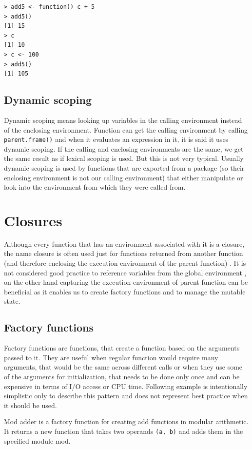 \documentclass[thesis=B,english]{FITthesis}[2012/10/20]
\begin{document}
\begin{verbatim}
> add5 <- function() c + 5
> add5()
[1] 15
> c
[1] 10
> c <- 100
> add5()
[1] 105
\end{verbatim}

\subsection{Dynamic scoping}
Dynamic scoping means looking up variables in the calling environment instead of the enclosing environment. Function can get the calling environment by calling \verb|parent.frame()| and when it evaluates an expression in it, it is said it uses dynamic scoping. If the calling and enclosing environments are the same, we get the same result as if lexical scoping is used. But this is not very typical. Usually dynamic scoping is used by functions that are exported from a package (so their enclosing environment is not our calling environment) that either manipulate or look into the environment from which they were called from.

\section{Closures}
Although every function that has an environment associated with it is a closure, the name closure is often used just for functions returned from another function (and therefore enclosing the execution environment of the parent function) \cite{advR}. It is not considered good practice to reference variables from the global environment \cite{advR}, on the other hand capturing the execution environment of parent function can be beneficial as it enables us to create factory functions and to manage the mutable state.

\subsection{Factory functions} \label{ssec:clos1}
Factory functions are functions, that create a function based on the arguments passed to it. They are useful when regular function would require many arguments, that would be the same across different calls or when they use some of the arguments for initialization, that needs to be done only once and can be expensive in terms of I/O access or CPU time. Following example is intentionally simplistic only to describe this pattern and does not represent best practice when it should be used.

Mod adder is a factory function for creating add functions in modular arithmetic. It returns a new function that takes two operands \verb|(a, b)| and adds them in the specified module mod.
\end{document}
